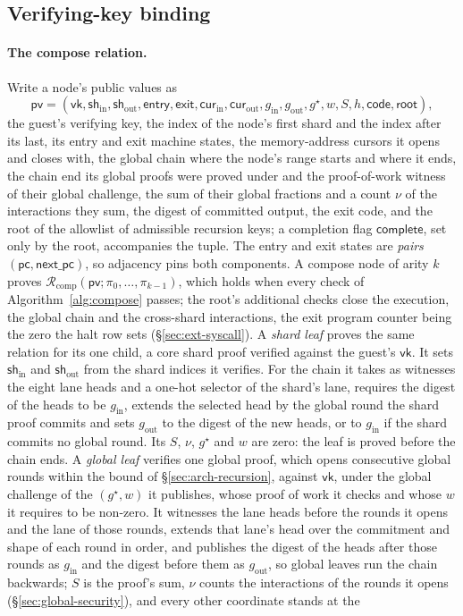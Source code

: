 \subsection{Verifying-key binding}
\label{sec:security-binding}

\paragraph{The compose relation.} Write a node's public values as
\[
  \mathsf{pv} = (\mathsf{vk}, \mathsf{sh}_{\mathrm{in}}, \mathsf{sh}_{\mathrm{out}}, \mathsf{entry}, \mathsf{exit}, \mathsf{cur}_{\mathrm{in}}, \mathsf{cur}_{\mathrm{out}}, g_{\mathrm{in}}, g_{\mathrm{out}}, g^\star, w, S, h, \mathsf{code}, \mathsf{root}),
\]
the guest's verifying key, the index of the node's first shard and the index after its last, its entry and exit machine states, the memory-address cursors it opens and closes with, the global chain where the node's range starts and where it ends, the chain end its global proofs were proved under and the proof-of-work witness of their global challenge, the sum of their global fractions and a count $\nu$ of the interactions they sum, the digest of committed output, the exit code, and the root of the allowlist of admissible recursion keys; a completion flag $\mathsf{complete}$, set only by the root, accompanies the tuple. The entry and exit states are \emph{pairs} $(\mathsf{pc}, \mathsf{next\_pc})$, so adjacency pins both components. A compose node of arity $k$ proves $\mathcal R_{\mathrm{comp}}(\mathsf{pv}; \pi_0,\dots,\pi_{k-1})$, which holds when every check of Algorithm~\ref{alg:compose} passes; the root's additional checks close the execution, the global chain and the cross-shard interactions, the exit program counter being the zero the halt row sets (\S\ref{sec:ext-syscall}). A \emph{shard leaf} proves the same relation for its one child, a core shard proof verified against the guest's $\mathsf{vk}$. It sets $\mathsf{sh}_{\mathrm{in}}$ and $\mathsf{sh}_{\mathrm{out}}$ from the shard indices it verifies. For the chain it takes as witnesses the eight lane heads and a one-hot selector of the shard's lane, requires the digest of the heads to be $g_{\mathrm{in}}$, extends the selected head by the global round the shard proof commits and sets $g_{\mathrm{out}}$ to the digest of the new heads, or to $g_{\mathrm{in}}$ if the shard commits no global round. Its $S$, $\nu$, $g^\star$ and $w$ are zero: the leaf is proved before the chain ends. A \emph{global leaf} verifies one global proof, which opens consecutive global rounds within the bound of \S\ref{sec:arch-recursion}, against $\mathsf{vk}$, under the global challenge of the $(g^\star, w)$ it publishes, whose proof of work it checks and whose $w$ it requires to be non-zero. It witnesses the lane heads before the rounds it opens and the lane of those rounds, extends that lane's head over the commitment and shape of each round in order, and publishes the digest of the heads after those rounds as $g_{\mathrm{in}}$ and the digest before them as $g_{\mathrm{out}}$, so global leaves run the chain backwards; $S$ is the proof's sum, $\nu$ counts the interactions of the rounds it opens (\S\ref{sec:global-security}), and every other coordinate stands at the 